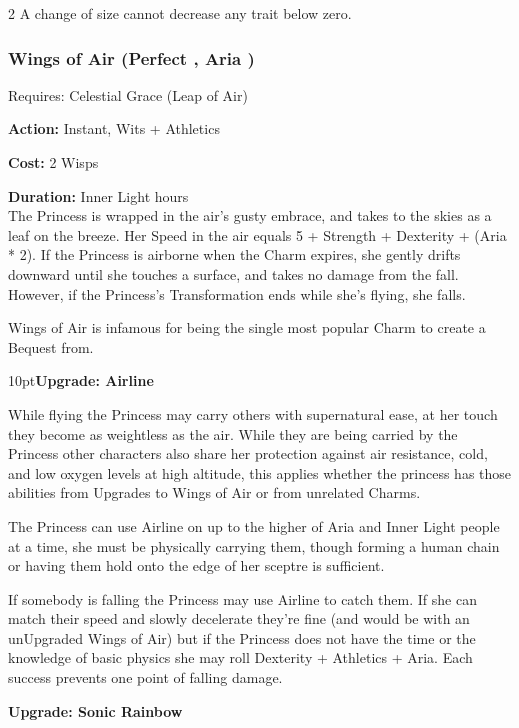 \begin{multicols}{2}
A change of size cannot decrease any trait below zero. 

\subsubsection*{Wings of Air (Perfect \textbullet\textbullet\textbullet\textbullet, Aria \textbullet\textbullet\textbullet)}

\noindent Requires: Celestial Grace (Leap of Air)

\noindent \textbf{Action:} Instant, Wits + Athletics

\noindent \textbf{Cost:} 2 Wisps

\noindent \textbf{Duration:} Inner Light hours \\

\noindent The Princess is wrapped in the air's gusty embrace, and takes to the skies as a leaf on the breeze. Her Speed in the air equals 5 + Strength + Dexterity + (Aria * 2). If the Princess is airborne when the Charm expires, she gently drifts downward until she touches a surface, and takes no damage from the fall. However, if the Princess's Transformation ends while she's flying, she falls.

Wings of Air is infamous for being the single most popular Charm to create a Bequest from. 

\begin{myindentpar}{10pt}\textbf{Upgrade: Airline}

While flying the Princess may carry others with supernatural ease, at her touch they become as weightless as the air. While they are being carried by the Princess other characters also share her protection against air resistance, cold, and low oxygen levels at high altitude, this applies whether the princess has those abilities from Upgrades to Wings of Air or from unrelated Charms.

The Princess can use Airline on up to the higher of Aria and Inner Light people at a time, she must be physically carrying them, though forming a human chain or having them hold onto the edge of her sceptre is sufficient. 

If somebody is falling the Princess may use Airline to catch them. If she can match their speed and slowly decelerate they're fine (and would be with an unUpgraded Wings of Air) but if the Princess does not have the time or the knowledge of basic physics she may roll Dexterity + Athletics + Aria. Each success prevents one point of falling damage. 

\textbf{Upgrade: Sonic Rainbow}


\end{myindentpar}
\end{multicols}
